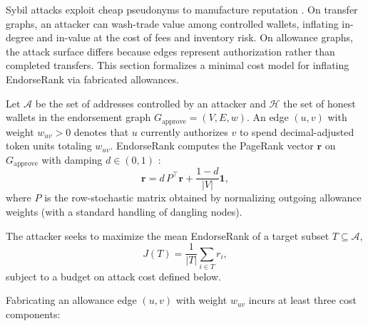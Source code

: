
Sybil attacks exploit cheap pseudonyms to manufacture reputation . On transfer graphs, an attacker can wash-trade value among controlled wallets, inflating in-degree and in-value at the cost of fees and inventory risk. On allowance graphs, the attack surface differs because edges represent authorization rather than completed transfers. This section formalizes a minimal cost model for inflating EndorseRank via fabricated allowances.


Let $\mathcal{A}$ be the set of addresses controlled by an attacker and $\mathcal{H}$ the set of honest wallets in the endorsement graph $G_{\text{approve}}=(V,E,w)$. An edge $(u,v)$ with weight $w_{uv}>0$ denotes that $u$ currently authorizes $v$ to spend decimal-adjusted token units totaling $w_{uv}$. EndorseRank computes the PageRank vector $\mathbf{r}$ on $G_{\text{approve}}$ with damping $d\in(0,1)$ :
\begin{equation}
\label{eq:pagerank-sybil}
\mathbf{r} = d\, P^{\top} \mathbf{r} + \frac{1-d}{|V|}\mathbf{1},
\end{equation}
where $P$ is the row-stochastic matrix obtained by normalizing outgoing allowance weights (with a standard handling of dangling nodes).

The attacker seeks to maximize the mean EndorseRank of a target subset $T\subseteq\mathcal{A}$,
\begin{equation}
\label{eq:objective}
J(T) = \frac{1}{|T|}\sum_{i\in T} r_i,
\end{equation}
subject to a budget on attack cost defined below.


Fabricating an allowance edge $(u,v)$ with weight $w_{uv}$ incurs at least three cost components:

